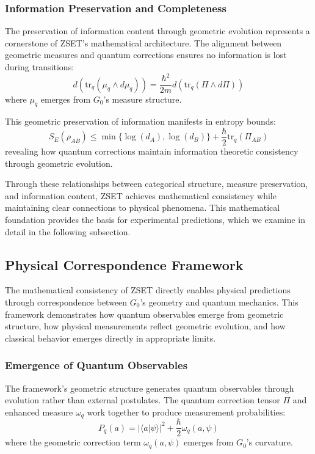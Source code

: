 \documentclass[10pt]{article}
\begin{document}
\subsubsection{Information Preservation and Completeness}

The preservation of information content through geometric evolution represents a cornerstone of ZSET's mathematical architecture. The alignment between geometric measures and quantum corrections ensures no information is lost during transitions:
\[
d(\text{tr}_q(\mu_q \wedge d\mu_q)) = \frac{\hbar^2}{2m} d(\text{tr}_q(\Pi \wedge d\Pi))
\]
where \(\mu_q\) emerges from \(G_0\)'s measure structure.

This geometric preservation of information manifests in entropy bounds:
\[
S_E(\rho_{AB}) \leq \min\{\log(d_A), \log(d_B)\} + \frac{\hbar}{2} \text{tr}_q(\Pi_{AB})
\]
revealing how quantum corrections maintain information theoretic consistency through geometric evolution.

Through these relationships between categorical structure, measure preservation, and information content, ZSET achieves mathematical consistency while maintaining clear connections to physical phenomena. This mathematical foundation provides the basis for experimental predictions, which we examine in detail in the following subsection.

\subsection{Physical Correspondence Framework}

The mathematical consistency of ZSET directly enables physical predictions through correspondence between \(G_0\)'s geometry and quantum mechanics. This framework demonstrates how quantum observables emerge from geometric structure, how physical measurements reflect geometric evolution, and how classical behavior emerges directly in appropriate limits.

\subsubsection{Emergence of Quantum Observables}

The framework's geometric structure generates quantum observables through evolution rather than external postulates. The quantum correction tensor \(\Pi\) and enhanced measure \(\omega_q\) work together to produce measurement probabilities:
\[
P_q(a) = |\langle a | \psi \rangle|^2 + \frac{\hbar}{2} \omega_q(a, \psi)
\]
where the geometric correction term \(\omega_q(a, \psi)\) emerges from \(G_0\)'s curvature.
\end{document}
